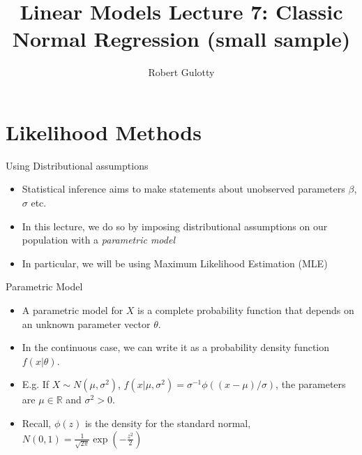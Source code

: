 \documentclass[aspectratio=169, handout, t]{beamer}
\title[PLSC 30700]{Linear Models Lecture 7: Classic Normal Regression (small sample)}
\author{Robert Gulotty}
\institute[Chicago]{University of Chicago}
\numberwithin{equation}{section}
\begin{document}
\begin{frame}
\maketitle
\end{frame}

\section{Likelihood Methods}

\setcounter{subsection}{1}


\begin{frame}{Using Distributional assumptions}
\begin{itemize}
\item Statistical inference aims to make statements about unobserved parameters $\beta$, $\sigma$ etc.
\item In this lecture, we do so by imposing distributional assumptions on our population with a \emph{parametric model}
\item In particular, we will be using Maximum Likelihood Estimation (MLE)
\end{itemize}
\end{frame}



\begin{frame}{Parametric Model}
\begin{itemize}
\item A parametric model for $X$ is a complete probability function that depends on an unknown parameter vector $\theta$.\pause
\item In the continuous case, we can write it as a probability density function $f(x|\theta)$.\pause
\item E.g. If $X\sim N(\mu,\sigma^2)$, $f(x|\mu,\sigma^2)=\sigma^{-1}\phi((x-\mu)/\sigma)$, the parameters are $\mu\in \mathbb{R}$ and $\sigma^2>0$.
\item Recall, $\phi(z)$ is the density for the standard normal, $N(0,1)=\frac{1}{\sqrt{2\pi}}\exp(-\frac{z^2}{2})$
\end{itemize}
\end{frame}
\end{document}
